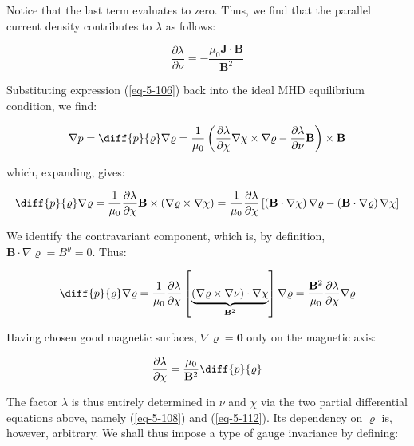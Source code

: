 Notice that the last term evaluates to zero. Thus, we find that the parallel current density contributes to $\lambda$ as follows:

\begin{equation}
    \label{eq-5-108}
    \frac{\partial\lambda}{\partial\nu}=-\frac{\mu_0\mathbf{J}\cdot\mathbf{B}}{\mathbf{B}^2}
\end{equation}

Substituting expression (\ref{eq-5-106}) back into the ideal MHD equilibrium condition, we find:

\begin{equation}
    \nabla p=\diff{p}{\varrho}\nabla\varrho=\frac{1}{\mu_0}\left(\frac{\partial\lambda}{\partial\chi}\nabla\chi\times\nabla\varrho-\frac{\partial\lambda}{\partial\nu}\mathbf{B}\right)\times\mathbf{B}
\end{equation}

which, expanding, gives:

\begin{equation}
    \diff{p}{\varrho}\nabla\varrho=\frac{1}{\mu_0}\frac{\partial\lambda}{\partial\chi}\mathbf{B}\times\left(\nabla\varrho\times\nabla\chi\right)=\frac{1}{\mu_0}\frac{\partial\lambda}{\partial\chi}\left[\left(\mathbf{B}\cdot\nabla\chi\right)\nabla\varrho-\left(\mathbf{B}\cdot\nabla\varrho\right)\nabla\chi\right]
\end{equation}

We identify the contravariant component, which is, by definition, $\mathbf{B}\cdot\nabla\varrho=B^\varrho=0$. Thus:

\begin{equation}
    \diff{p}{\varrho}\nabla\varrho=\frac{1}{\mu_0}\frac{\partial\lambda}{\partial\chi}\left[\underbrace{\left(\nabla\varrho\times\nabla\nu\right)\cdot\nabla\chi}_{\mathbf{B}^2}\right]\nabla\varrho=\frac{\mathbf{B}^2}{\mu_0}\frac{\partial\lambda}{\partial\chi}\nabla\varrho
\end{equation}

Having chosen good magnetic surfaces, $\nabla\varrho=\mathbf{0}$ only on the magnetic axis:

\begin{equation}
    \label{eq-5-112}
    \frac{\partial\lambda}{\partial\chi}=\frac{\mu_0}{\mathbf{B}^2}\diff{p}{\varrho}
\end{equation}

The factor $\lambda$ is thus entirely determined in $\nu$ and $\chi$ via the two partial differential equations above, namely (\ref{eq-5-108}) and (\ref{eq-5-112}). Its dependency on $\varrho$ is, however, arbitrary. We shall thus impose a type of gauge invariance by defining:

